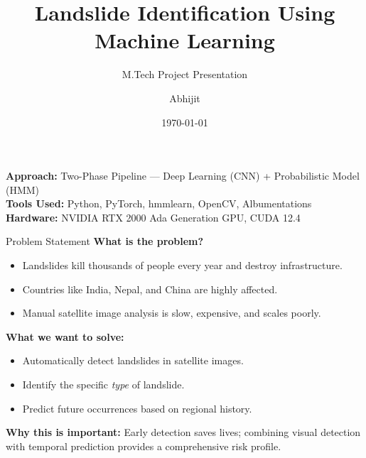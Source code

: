 \documentclass[11pt]{beamer}
\title[Landslide Identification]{Landslide Identification Using Machine Learning}
\subtitle{M.Tech Project Presentation}
\author{Abhijit} %
\date{\today}
\begin{document}
\begin{frame}
    \titlepage
    \begin{center}
        \textbf{Approach:} Two-Phase Pipeline — Deep Learning (CNN) + Probabilistic Model (HMM) \\
        \textbf{Tools Used:} Python, PyTorch, hmmlearn, OpenCV, Albumentations \\
        \textbf{Hardware:} NVIDIA RTX 2000 Ada Generation GPU, CUDA 12.4
    \end{center}
\end{frame}

\begin{frame}{Problem Statement}
    \textbf{What is the problem?}
    \begin{itemize}
        \item Landslides kill thousands of people every year and destroy infrastructure.
        \item Countries like India, Nepal, and China are highly affected.
        \item Manual satellite image analysis is slow, expensive, and scales poorly.
    \end{itemize}
    \vspace{0.3cm}
    \textbf{What we want to solve:}
    \begin{itemize}
        \item Automatically detect landslides in satellite images.
        \item Identify the specific \textit{type} of landslide.
        \item Predict future occurrences based on regional history.
    \end{itemize}
    \vspace{0.3cm}
    \textbf{Why this is important:} Early detection saves lives; combining visual detection with temporal prediction provides a comprehensive risk profile.
\end{frame}
\end{document}
